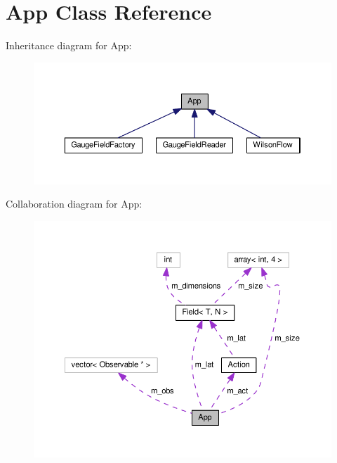 \hypertarget{classApp}{}\section{App Class Reference}
\label{classApp}


Inheritance diagram for App\+:
\nopagebreak
\begin{figure}[H]
\begin{center}
\leavevmode
\includegraphics[width=350pt]{classApp__inherit__graph}
\end{center}
\end{figure}


Collaboration diagram for App\+:
\nopagebreak
\begin{figure}[H]
\begin{center}
\leavevmode
\includegraphics[width=350pt]{classApp__coll__graph}
\end{center}
\end{figure}

